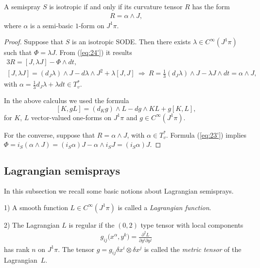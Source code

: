 \documentclass[pdftex]{sigma}
\begin{document}
\begin{proposition}
\label{prop:iso} A semispray $S$ is isotropic if and only if its
curvature tensor $R$ has the form
\begin{gather*}
R=\alpha\wedge J,%
\end{gather*}
 where $\alpha$ is a semi-basic $1$-form on $J^{1}\pi$.
\end{proposition}

\begin{proof}
Suppose that $S$ is an isotropic SODE. Then there exists $\lambda\in C^{\infty}(J^{1}\pi)$
such that $\Phi=\lambda J$. From (\ref{eq:24'}) it results
\begin{gather*}
3R   =   [J,\lambda J]-\Phi\wedge dt,\\
{}[J,\lambda J]   =   \left(d_{J}\lambda\right)\wedge J-d\lambda\wedge J^{2}+\lambda[J,J] \ \Rightarrow \
R   =   \frac{1}{3}\left(d_{J}\lambda\right)\wedge J-\lambda J\wedge dt=\alpha\wedge J,
\end{gather*}
 with $\alpha=\frac{1}{3}d_{J}\lambda+\lambda dt\in T_{v}^{*}$.

In the above calculus we used the formula \cite{grifone00}\[
[K,gL]= (d_{K}g )\wedge L-dg\wedge KL+g[K,L],\]
 for $K$, $L$ vector-valued one-forms on $J^{1}\pi$ and $g\in C^{\infty}(J^{1}\pi)$.

For the converse, suppose that $R=\alpha\wedge J$, with $\alpha\in T_{v}^{*}$.
Formula (\ref{eq:23'}) implies $\Phi=i_{S} (\alpha\wedge J )= (i_{S}\alpha )J-\alpha\wedge i_{S}J= (i_{S}\alpha )J$.
\end{proof}


\subsection{Lagrangian semisprays}

In this subsection we recall some basic notions about Lagrangian semisprays.

\begin{definition}\null \qquad

1) A smooth function $L\in C^{\infty}(J^{1}\pi)$ is called a \emph{Lagrangian
function}.

2) The Lagrangian $L$ is regular if the $(0,2)$ type tensor with
local components
\begin{gather*}
g_{ij}\big(x^{\alpha},y^{k}\big)=\frac{\partial^{2}L}{\partial y^{i}\partial y^{j}}%
\end{gather*}
has rank $n$ on $J^{1}\pi$. The tensor $g=g_{ij}\delta x^{i}\otimes\delta x^{j}$
is called the \emph{metric tensor} of the Lagrangian~$L$.
\end{definition}
\end{document}
